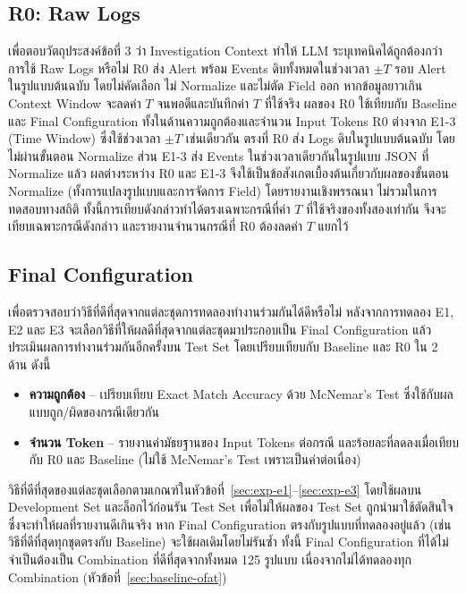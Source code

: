 \subsection{R0: Raw Logs}
\label{sec:exp-r0}
เพื่อตอบวัตถุประสงค์ข้อที่ 3 ว่า Investigation Context ทำให้ LLM ระบุเทคนิคได้ถูกต้องกว่าการใช้ Raw Logs หรือไม่
R0 ส่ง Alert พร้อม Events ดิบทั้งหมดในช่วงเวลา $\pm T$ รอบ Alert ในรูปแบบต้นฉบับ
โดยไม่คัดเลือก ไม่ Normalize และไม่ตัด Field ออก
หากข้อมูลยาวเกิน Context Window จะลดค่า $T$ จนพอดีและบันทึกค่า $T$ ที่ใช้จริง
ผลของ R0 ใช้เทียบกับ Baseline และ Final Configuration ทั้งในด้านความถูกต้องและจำนวน Input Tokens
R0 ต่างจาก E1-3 (Time Window) ซึ่งใช้ช่วงเวลา $\pm T$ เช่นเดียวกัน ตรงที่ R0 ส่ง Logs ดิบในรูปแบบต้นฉบับ
โดยไม่ผ่านขั้นตอน Normalize ส่วน E1-3 ส่ง Events ในช่วงเวลาเดียวกันในรูปแบบ JSON ที่ Normalize แล้ว
ผลต่างระหว่าง R0 และ E1-3 จึงใช้เป็นข้อสังเกตเบื้องต้นเกี่ยวกับผลของขั้นตอน Normalize
(ทั้งการแปลงรูปแบบและการจัดการ Field) โดยรายงานเชิงพรรณนา ไม่รวมในการทดสอบทางสถิติ
ทั้งนี้การเทียบดังกล่าวทำได้ตรงเฉพาะกรณีที่ค่า $T$ ที่ใช้จริงของทั้งสองเท่ากัน จึงจะเทียบเฉพาะกรณีดังกล่าว
และรายงานจำนวนกรณีที่ R0 ต้องลดค่า $T$ แยกไว้

\subsection{Final Configuration}
\label{sec:exp-final}
เพื่อตรวจสอบว่าวิธีที่ดีที่สุดจากแต่ละชุดการทดลองทำงานร่วมกันได้ดีหรือไม่
หลังจากการทดลอง E1, E2 และ E3 จะเลือกวิธีที่ให้ผลดีที่สุดจากแต่ละชุดมาประกอบเป็น Final Configuration
แล้วประเมินผลการทำงานร่วมกันอีกครั้งบน Test Set โดยเปรียบเทียบกับ Baseline และ R0 ใน 2 ด้าน ดังนี้
\begin{itemize}
  \item \textbf{ความถูกต้อง} -- เปรียบเทียบ Exact Match Accuracy ด้วย McNemar's Test
        ซึ่งใช้กับผลแบบถูก/ผิดของกรณีเดียวกัน
  \item \textbf{จำนวน Token} -- รายงานค่ามัธยฐานของ Input Tokens ต่อกรณี
        และร้อยละที่ลดลงเมื่อเทียบกับ R0 และ Baseline (ไม่ใช้ McNemar's Test เพราะเป็นค่าต่อเนื่อง)
\end{itemize}

วิธีที่ดีที่สุดของแต่ละชุดเลือกตามเกณฑ์ในหัวข้อที่~\ref{sec:exp-e1}--\ref{sec:exp-e3}
โดยใช้ผลบน Development Set และล็อกไว้ก่อนรัน Test Set
เพื่อไม่ให้ผลของ Test Set ถูกนำมาใช้ตัดสินใจ ซึ่งจะทำให้ผลที่รายงานดีเกินจริง
หาก Final Configuration ตรงกับรูปแบบที่ทดลองอยู่แล้ว (เช่น วิธีที่ดีที่สุดทุกชุดตรงกับ Baseline)
จะใช้ผลเดิมโดยไม่รันซ้ำ
ทั้งนี้ Final Configuration ที่ได้ไม่จำเป็นต้องเป็น Combination ที่ดีที่สุดจากทั้งหมด 125 รูปแบบ
เนื่องจากไม่ได้ทดลองทุก Combination (หัวข้อที่~\ref{sec:baseline-ofat})

